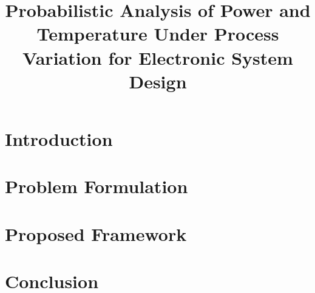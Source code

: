\documentclass[journal]{IEEEtran}
\title{{\TitleFont Probabilistic Analysis of Power and Temperature Under Process
Variation for Electronic System Design}}
\author{}
\begin{document}
  \maketitle

  \begin{abstract}
    
  \end{abstract}


  \section{Introduction} 
  

  \section{Problem Formulation} 
  

  \section{Proposed Framework} 
  

  \section{Conclusion} 
  

  
  
\end{document}
